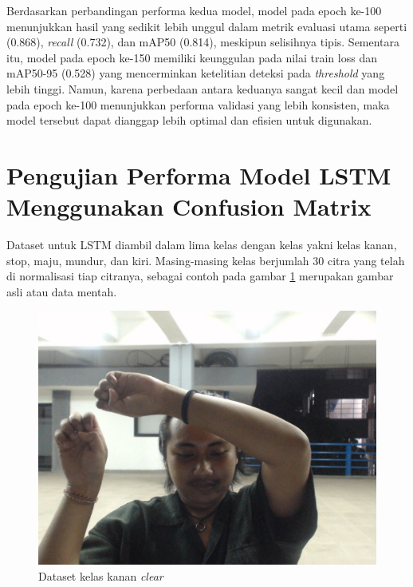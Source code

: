 Berdasarkan perbandingan performa kedua model, model pada epoch ke-100 menunjukkan hasil yang sedikit lebih unggul dalam metrik evaluasi utama seperti \emph{} (0.868), \emph{recall} (0.732), dan mAP50 (0.814), meskipun selisihnya tipis. Sementara itu, model pada epoch ke-150 memiliki keunggulan pada nilai train loss dan mAP50-95 (0.528) yang mencerminkan ketelitian deteksi pada \emph{threshold} yang lebih tinggi. Namun, karena perbedaan antara keduanya sangat kecil dan model pada epoch ke-100 menunjukkan performa validasi yang lebih konsisten, maka model tersebut dapat dianggap lebih optimal dan efisien untuk digunakan.

\section{Pengujian Performa Model LSTM Menggunakan Confusion Matrix}
Dataset untuk LSTM diambil dalam lima kelas dengan kelas yakni kelas kanan, stop, maju, mundur, dan kiri. Masing-masing kelas berjumlah 30 citra yang
telah di normalisasi tiap citranya, sebagai contoh pada gambar \ref{fig:Data set kelas kanan raw} merupakan gambar asli atau data mentah.
\begin{figure} [H] \centering
  \includegraphics[scale=0.2]{gambar/0-clear.jpg}
  \caption{Dataset kelas kanan \emph{clear}}
  \label{fig:Data set kelas kanan raw}
\end{figure}

